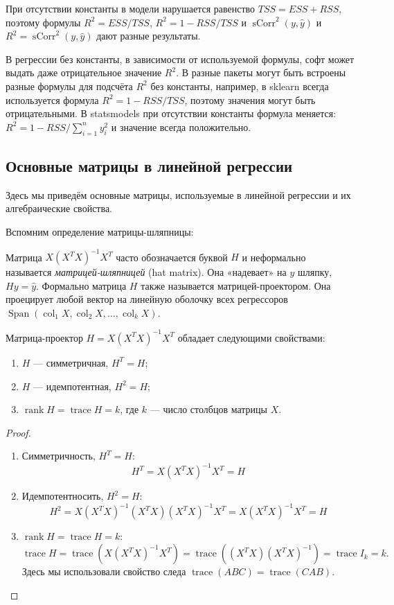 \documentclass[12pt]{article}
\DeclareMathOperator{\sCorr}{sCorr}
\DeclareMathOperator{\col}{col}
\DeclareMathOperator{\trace}{trace}
\DeclareMathOperator{\rank}{rank}
\DeclareMathOperator{\Span}{Span}
\newcommand{\hy}{\hat{y}}
\newcommand{\RSS}{RSS}
\newcommand{\ESS}{ESS}
\newcommand{\TSS}{TSS}
\begin{document}
При отсутствии константы в модели нарушается равенство $\TSS = \ESS + \RSS$, поэтому формулы $R^2 = \ESS/\TSS$, $R^2 = 1 - \RSS/\TSS$ и $\sCorr^2(y, \hy)$ и 
$R^2 = \sCorr^2(y, \hy)$ дают разные результаты.

В регрессии без константы, в зависимости от используемой формулы, софт может выдать даже отрицательное значение $R^2$.
В разные пакеты могут быть встроены разные формулы для подсчёта $R^2$ без константы, например, в sklearn всегда используется формула $R^2 = 1 - \RSS/\TSS$, поэтому значения могут быть отрицательными. В statsmodels при отсутствии константы формула меняется: $R^2 = 1 - \RSS/\sum_{i=1}^n y_i^2$ и значение всегда положительно.  


\subsection{Основные матрицы в линейной регрессии}

Здесь мы приведём основные матрицы, используемые в линейной регрессии и их алгебраические свойства. 

Вспомним определение матрицы-шляпницы:
\begin{definition}
Матрица $X(X^TX)^{-1} X^T$ часто обозначается буквой $H$ и неформально называется \emph{матрицей-шляпницей} (hat matrix).
Она «надевает» на $y$ шляпку, $Hy = \hat y$.
Формально матрица $H$ также называется матрицей-проектором. 
Она проецирует любой вектор на линейную оболочку всех регрессоров $\Span(\col_1 X, \col_2 X, \dots, \col_k X)$.
\end{definition}

\begin{theorem}
Матрица-проектор $H = X(X^TX)^{-1}X^T$ обладает следующими свойствами:
\begin{enumerate}
    \item $H$ — симметричная, $H^T = H$;
    \item $H$ — идемпотентная, $H^2 = H$;
    \item $\rank H = \trace H = k$, где $k$ — число столбцов матрицы $X$.
\end{enumerate}
\end{theorem}
\begin{proof}

\begin{enumerate}
    \item Симметричность, $H^T = H$:
    \[
    H^T = X(X^{T}X)^{-1}X^{T} = H
    \]
    \item Идемпотентносить, $H^2 = H$:
    \[
    H^2 =  X(X^{T}X)^{-1}(X^{T}X)(X^{T}X)^{-1}X^{T} = X(X^{T}X)^{-1}X^{T} = H
    \]
    \item $\rank H = \trace H = k$:
    \[
    \trace H = \trace (X(X^{T}X)^{-1}X^{T}) = \trace ((X^{T}X)(X^{T}X)^{-1}) = \trace I_k = k.
    \]
    Здесь мы использовали свойство следа $\trace(ABC) = \trace(CAB)$.
    \end{enumerate}
\end{proof}
\end{document}
